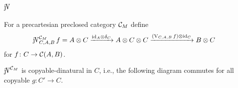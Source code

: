 \documentclass[runningheads,envcountsame]{llncs}
\newcommand{\monad}{M}
\begin{document}
\subsection{$\juncurry$}

\begin{definition} 
    For a precartesian preclosed category $\C_\monad$ define 
    \begin{align}
        \juncurry[\C_\monad]_{C,A,B}\,f &= \tensor{A}{C} \xrightarrow{\tensor{\id_A}{\dup_C}} \tensor{A}{\tensor{C}{C}} \xrightarrow{\tensor{(\uncurry_{C,A,B}\,f)}{\id_C}} \tensor{B}{C}
    \end{align}
    for $f\colon C \to \mathcal{C}(A, B)$.
\end{definition}

\begin{lemma}
    $\juncurry[\C_\monad]$ is copyable-dinatural in $C$, i.e., the following diagram commutes for all copyable $g\colon C' \to C$.
    \begin{center}
    \end{center}
\end{lemma}
\end{document}
